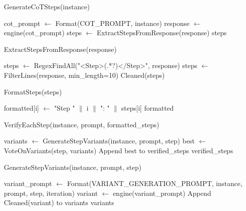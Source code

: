 \documentclass{article}
\begin{document}
\begin{algorithm}
\caption{GenerateCoTSteps(instance)}
\begin{algorithmic}[1]
\State cot\_prompt $\gets$ Format(COT\_PROMPT, instance)
\State response $\gets$ engine(cot\_prompt)
\State steps $\gets$ ExtractStepsFromResponse(response)
\State \Return steps
\end{algorithmic}
\end{algorithm}

\begin{algorithm}
\caption{ExtractStepsFromResponse(response)}
\begin{algorithmic}[1]
\State steps $\gets$ RegexFindAll("<Step>(.*?)</Step>", response)
    \State steps $\gets$ FilterLines(response, min\_length=10)
\EndIf
\State \Return Cleaned(steps)
\end{algorithmic}
\end{algorithm}

\begin{algorithm}
\caption{FormatSteps(steps)}
\begin{algorithmic}[1]
    \State formatted[i] $\gets$ "Step " $\|$ i $\|$ ": " $\|$ steps[i]
\EndFor
\State \Return formatted
\end{algorithmic}
\end{algorithm}

\begin{algorithm}
\caption{VerifyEachStep(instance, prompt, formatted\_steps)}
\begin{algorithmic}[1]
    \State variants $\gets$ GenerateStepVariants(instance, prompt, step)
    \State best $\gets$ VoteOnVariants(step, variants)
    \State Append best to verified\_steps
\EndFor
\State \Return verified\_steps
\end{algorithmic}
\end{algorithm}

\begin{algorithm}
\caption{GenerateStepVariants(instance, prompt, step)}
\begin{algorithmic}[1]
    \State variant\_prompt $\gets$ Format(VARIANT\_GENERATION\_PROMPT, instance, prompt, step, iteration)
    \State variant $\gets$ engine(variant\_prompt)
    \State Append Cleaned(variant) to variants
\EndFor
\State \Return variants
\end{algorithmic}
\end{algorithm}
\end{document}
